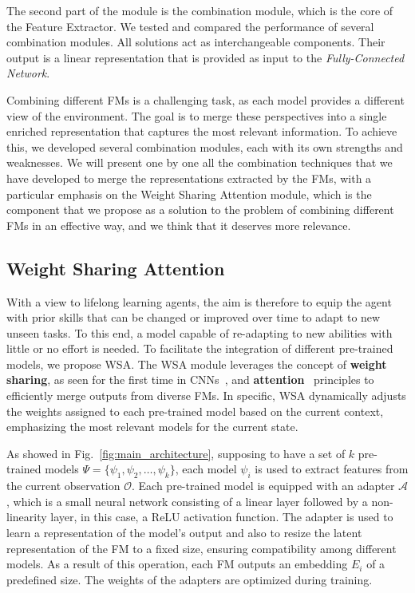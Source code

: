 The second part of the module is the combination module, which is the core of the Feature Extractor.
We tested and compared the performance of several combination modules.
All solutions act as interchangeable components.
Their output is a linear representation that is provided as input to the \textit{Fully-Connected Network}.


Combining different FMs is a challenging task, as each model provides a different view of the environment.
The goal is to merge these perspectives into a single enriched representation that captures the most relevant information.
To achieve this, we developed several combination modules, each with its own strengths and weaknesses.
We will present one by one all the combination techniques that we have developed to merge the representations extracted by the FMs, with a particular emphasis on the Weight Sharing Attention module, which is the component that we propose as a solution to the problem of combining different FMs in an effective way, and we think that it deserves more relevance.


\subsection{Weight Sharing Attention}
\label{sec:wsa}

With a view to lifelong learning agents, the aim is therefore to equip the agent with prior skills that can be changed or improved over time to adapt to new unseen tasks.
To this end, a model capable of re-adapting to new abilities with little or no effort is needed.
To facilitate the integration of different pre-trained models, we propose WSA\@.
The WSA module leverages the concept of \textbf{weight sharing}, as seen for the first time in CNNs~\citep{fukushima1980neocognitron}, and \textbf{attention}~\citep{vaswani2017attention} principles to efficiently merge outputs from diverse FMs.
In specific, WSA dynamically adjusts the weights assigned to each pre-trained model based on the current context, emphasizing the most relevant models for the current state.

As showed in Fig.~\ref{fig:main_architecture}, supposing to have a set of $k$ pre-trained models $\Psi = \{\psi_1, \psi_2, \ldots, \psi_k\}$, each model $\psi_i$ is used to extract features from the current observation $\mathcal{O}$.
Each pre-trained model is equipped with an adapter $\mathcal{A}$, which is a small neural network consisting of a linear layer followed by a non-linearity layer, in this case, a ReLU activation function.
The adapter is used to learn a representation of the model's output and also to resize the latent representation of the FM to a fixed size, ensuring compatibility among different models.
As a result of this operation, each FM outputs an embedding $E_i$ of a predefined size.
The weights of the adapters are optimized during training.

